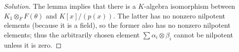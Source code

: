 \documentclass[10pt]{article}
\newenvironment{soln}{\begin{proof}[Solution]}{\end{proof}}
\begin{document}
\begin{soln}
    The lemma implies that there is a $K$-algebra isomorphism
    between $K_1\otimes_F F(\theta)$ and $K[x]/(p(x))$.
    The latter has no nonzero nilpotent elements (because it is a field),
    so the former also has no nonzero nilpotent elements;
    thus the arbitrarily chosen element $\sum \alpha_i\otimes\beta_i$
    cannot be nilpotent unless it is zero.
\end{soln}
\end{document}
